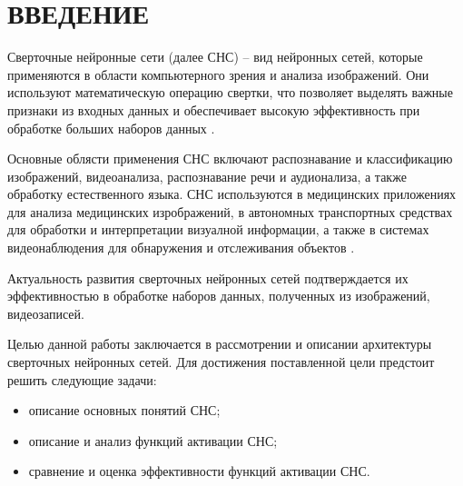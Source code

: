 \chapter*{ВВЕДЕНИЕ}

Сверточные нейронные сети (далее СНС) -- вид нейронных сетей, которые применяются в области компьютерного зрения и анализа изображений. Они используют математическую операцию свертки, что позволяет выделять важные признаки из входных данных и обеспечивает высокую эффективность при обработке больших наборов данных \cite{understanding}.

Основные облясти применения СНС включают распознавание и классификацию изображений, видеоанализа, распознавание речи и аудионализа, а также обработку естественного языка. СНС используются в медицинских приложениях для анализа медицинских изрображений, в автономных транспортных средствах для обработки и интерпретации визуалной информации, а также в системах видеонаблюдения для обнаружения и отслеживания объектов \cite{survey}.

Актуальность развития сверточных нейронных сетей подтверждается их эффективностью в обработке наборов данных, полученных из изображений, видеозаписей.

Целью данной работы заключается в рассмотрении и описании архитектуры сверточных нейронных сетей.
Для достижения поставленной цели предстоит решить следующие задачи:

\begin{itemize}[label=---]
	\item описание основных понятий СНС;
	\item описание и анализ функций активации СНС;
	\item сравнение и оценка эффективности функций активации СНС.
\end{itemize}
